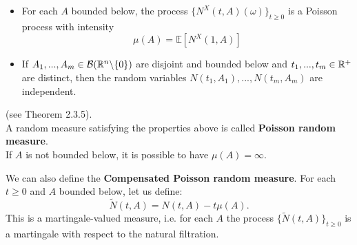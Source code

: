 \begin{itemize}
 \item For each $A$ bounded below, the process $\bigl \{ N^X(t,A)(\omega) \bigr \}_{t\geq 0}$ is a Poisson process with intensity 
 \begin{equation}
 \mu(A) = \mathbb{E}[N^X(1,A) ] 
 \end{equation}
 \item If $A_1, ..., A_m \in \mathcal{B}(\mathbb{R}^n \backslash \{ 0 \})$ are disjoint and bounded below and $t_1, ..., t_m \in \mathbb{R}^+$ are distinct, then
 the random variables $N(t_1,A_1), ..., N(t_m,A_m)$ are independent.
\end{itemize}
(see \cite{Applebaum} Theorem 2.3.5). \\
A random measure satisfying the properties above is called \textbf{Poisson random measure}.\\
If $A$ is not bounded below, it is possible to have $\mu(A) = \infty$. 

We can also define the \textbf{Compensated Poisson random measure}. For each $t \geq 0$ and $A$ bounded below, let us define: 
\begin{equation}
 \tilde{N}(t,A) = N(t,A) - t\mu(A). 
\end{equation}
This is a martingale-valued measure, i.e. for each $A$ the process $\bigl \{ \tilde{N}(t,A) \bigr \}_{t\geq 0} $ is a martingale with respect to the natural filtration.  


